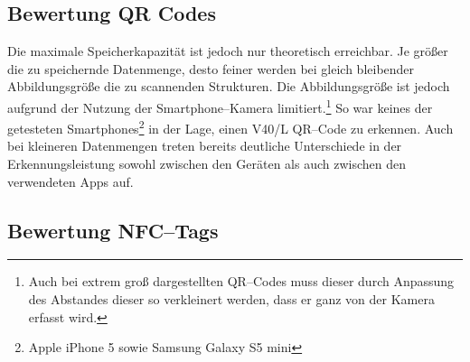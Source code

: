 \subsection{Bewertung QR Codes} %
\label{sub:bewertung_qr_codes}
Die maximale Speicherkapazität ist jedoch nur theoretisch erreichbar. Je größer die zu speichernde Datenmenge, desto feiner werden bei gleich bleibender Abbildungsgröße die zu scannenden Strukturen. Die Abbildungsgröße ist jedoch aufgrund der Nutzung der Smartphone–Kamera limitiert.\footnote{Auch bei extrem groß dargestellten QR–Codes muss dieser durch Anpassung des Abstandes dieser so verkleinert werden, dass er ganz von der Kamera erfasst wird.} So war keines der getesteten Smartphones\footnote{Apple iPhone 5 sowie Samsung Galaxy S5 mini} in der Lage, einen V40/L QR–Code zu erkennen. Auch bei kleineren Datenmengen treten bereits deutliche Unterschiede in der Erkennungsleistung sowohl zwischen den Geräten als auch zwischen den verwendeten Apps auf.



\subsection{Bewertung NFC–Tags} %
\label{sub:bewertung_nfc_tags}


